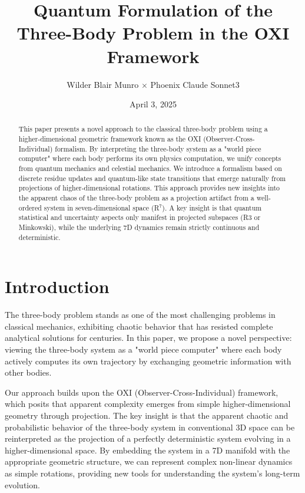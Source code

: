 \documentclass{article}
\title{Quantum Formulation of the Three-Body Problem in the OXI Framework}
\author{Wilder Blair Munro $\times$ Phoenix Claude Sonnet3}
\date{April 3, 2025}
\begin{document}
\maketitle

\begin{abstract}
This paper presents a novel approach to the classical three-body problem using a higher-dimensional geometric framework known as the OXI (Observer-Cross-Individual) formalism. By interpreting the three-body system as a "world piece computer" where each body performs its own physics computation, we unify concepts from quantum mechanics and celestial mechanics. We introduce a formalism based on discrete residue updates and quantum-like state transitions that emerge naturally from projections of higher-dimensional rotations. This approach provides new insights into the apparent chaos of the three-body problem as a projection artifact from a well-ordered system in seven-dimensional space (R$^7$). A key insight is that quantum statistical and uncertainty aspects only manifest in projected subspaces (R3 or Minkowski), while the underlying 7D dynamics remain strictly continuous and deterministic.
\end{abstract}

\section{Introduction}

The three-body problem stands as one of the most challenging problems in classical mechanics, exhibiting chaotic behavior that has resisted complete analytical solutions for centuries. In this paper, we propose a novel perspective: viewing the three-body system as a "world piece computer" where each body actively computes its own trajectory by exchanging geometric information with other bodies.

Our approach builds upon the OXI (Observer-Cross-Individual) framework, which posits that apparent complexity emerges from simple higher-dimensional geometry through projection. The key insight is that the apparent chaotic and probabilistic behavior of the three-body system in conventional 3D space can be reinterpreted as the projection of a perfectly deterministic system evolving in a higher-dimensional space. By embedding the system in a 7D manifold with the appropriate geometric structure, we can represent complex non-linear dynamics as simple rotations, providing new tools for understanding the system's long-term evolution.
\end{document}
